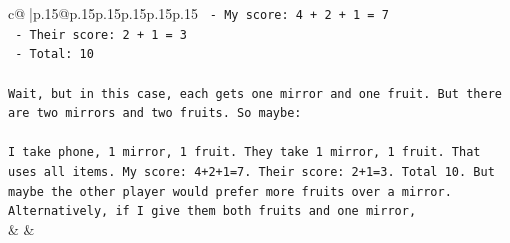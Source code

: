 \documentclass{article}
\begin{document}
{\begin{supertabular}{c@{$\;$}|p{.15\linewidth}@{}p{.15\linewidth}p{.15\linewidth}p{.15\linewidth}p{.15\linewidth}p{.15\linewidth}}
{{{\texttt{   {-} My score: 4 + 2 + 1 = 7} \\
\texttt{   {-} Their score: 2 + 1 = 3} \\
\texttt{   {-} Total: 10} \\
\\ 
\texttt{Wait, but in this case, each gets one mirror and one fruit. But there are two mirrors and two fruits. So maybe:} \\
\\ 
\texttt{I take phone, 1 mirror, 1 fruit. They take 1 mirror, 1 fruit. That uses all items. My score: 4+2+1=7. Their score: 2+1=3. Total 10. But maybe the other player would prefer more fruits over a mirror. Alternatively, if I give them both fruits and one mirror,} \\
            }
        }
    }
    & & \\ \\


\end{supertabular}}
\end{document}
